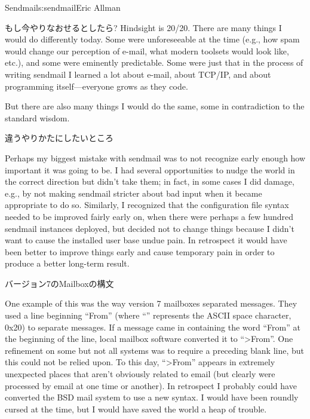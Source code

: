 \begin{aosachapter}{Sendmail}{s:sendmail}{Eric Allman}
\begin{aosasect1}{もし今やりなおせるとしたら?}
Hindsight is 20/20. There are many things I would do differently
today.  Some were unforeseeable at the time (e.g., how spam would
change our perception of e-mail, what modern toolsets would look like,
etc.), and some were eminently predictable. Some were just that in the
process of writing sendmail I learned a lot about e-mail, about TCP/IP,
and about programming itself---everyone grows as they code.

But there are also many things I would do the same, some in
contradiction to the standard wisdom.

\begin{aosasect2}{違うやりかたにしたいところ}

Perhaps my biggest mistake with sendmail was to not recognize early
enough how important it was going to be. I had several opportunities
to nudge the world in the correct direction but didn't take them; in
fact, in some cases I did damage, e.g., by not making sendmail
stricter about bad input when it became appropriate to do
so. Similarly, I recognized that the configuration file syntax needed
to be improved fairly early on, when there were perhaps a few hundred
sendmail instances deployed, but decided not to change things because
I didn't want to cause the installed user base undue pain. In
retrospect it would have been better to improve things early and
cause temporary pain in order to produce a better long-term result.

\begin{aosasect3}{バージョン7のMailboxの構文}

One example of this was the way version 7 mailboxes separated
messages.  They used a line beginning ``From\textvisiblespace'' (where
``\textvisiblespace'' represents the ASCII space character, 0x20) to separate
messages. If a message came in containing the word ``From\textvisiblespace''
at the
beginning of the line, local mailbox software converted it to
``{\textgreater}From\textvisiblespace''.
One refinement on some but not all systems was
to require a preceding blank line, but this could not be relied
upon. To this day, ``{\textgreater}From'' appears in extremely
unexpected places that aren't obviously related to email (but clearly
were processed by email at one time or another). In retrospect I
probably could have converted the BSD mail system to use a new syntax.
I would have been roundly cursed at the time, but I would have saved
the world a heap of trouble.


\end{aosasect3}
\end{aosasect2}
\end{aosasect1}
\end{aosachapter}
